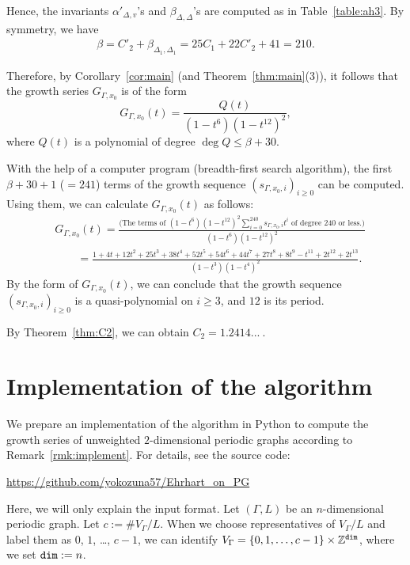 Hence, the invariants $\alpha ' _{\Delta, v}$'s and $\beta_{\Delta, \Delta}$'s are computed as in Table~\ref{table:ah3}. 
By symmetry, we have 
\begin{align*}
\beta 
= C'_2 + \beta _{\Delta_1, \Delta_1}
= 25 C_1 + 22 C'_2 + 41
= 210. 
\end{align*}

Therefore, by Corollary~\ref{cor:main} (and Theorem~\ref{thm:main}(3)), 
it follows that the growth series $G_{\Gamma, x_0}$ is of the form 
\[
G_{\Gamma, x_0}(t) = \frac{Q(t)}{(1-t^6)(1-t^{12})^2}, 
\]
where $Q(t)$ is a polynomial of degree $\deg Q \le \beta + 30$. 

With the help of a computer program (breadth-first search algorithm), 
the first $\beta + 30 + 1$ ($= 241$) terms of the growth sequence $(s_{\Gamma, x_0, i})_{i \ge 0}$ can be computed. 
Using them, we can calculate $G_{\Gamma, x_0}(t)$ as follows:  
{\small
\begin{align*}
&G_{\Gamma, x_0}(t) 
=  \frac{\bigl( \text{The terms of $(1-t^6)(1-t^{12})^2 \sum _{i = 0}^{240}  s_{\Gamma, x_0, i} t^i $ of degree $240$ or less.} \bigr)}{(1-t^6)(1-t^{12})^2} \\
&\qquad = \frac{1 + 4t + 12t^2 + 25t^3 +38t^4 + 52t^5 + 54t^6 + 44t^7 + 27t^8 + 8t^9 - t^{11} + 2 t^{12} + 2 t^{13}}{(1- t^3)(1-t^4)^2}. 
\end{align*}
\normalsize}By the form of $G_{\Gamma, x_0}(t)$, 
we can conclude that the growth sequence $(s_{\Gamma, x_0, i})_{i \ge 0}$ is a quasi-polynomial on $i \ge 3$, 
and $12$ is its period. 

\begin{rmk}
By Theorem~\ref{thm:C2}, we can obtain $C_2 = 1.2414...\ $. 
\end{rmk}


\appendix
\section{Implementation of the algorithm}\label{section:a}
We prepare an implementation of the algorithm in {\sf Python} to compute the growth series of unweighted $2$-dimensional periodic graphs according to Remark~\ref{rmk:implement}. 
For details, see the source code:
\begin{center}
\url{https://github.com/yokozuna57/Ehrhart_on_PG}
\end{center}
Here, we will only explain the input format. 
Let $(\Gamma, L)$ be an $n$-dimensional periodic graph. 
Let $c :=\# V_\Gamma / L$. 
When we choose representatives of $V_\Gamma / L$ and label them as $0$, $1$, \dots, $c-1$, 
we can identify $V_{\Gamma} = \{0,1,\ldots, c-1\} \times \mathbb{Z}^{\tt dim}$, where we set ${\tt dim} := n$. 

